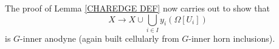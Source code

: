 \documentclass[a4paper,10pt,draft]{article}%
\begin{document}
\begin{remark}
The proof of Lemma \ref{CHAREDGE DEF} now carries out to show that 
\begin{equation}
	X \to X \cup \bigcup_{i \in I} y_i(\Omega[U_i])
\end{equation}
is $G$-inner anodyne (again built cellularly from $G$-inner horn inclusions).
\end{remark}


\end{document}
